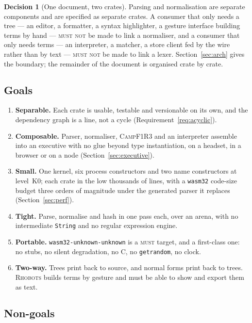 \documentclass[11pt,a4paper]{article}
\newcommand{\code}[1]{\texttt{#1}}
\newcommand{\Camp}{\textsc{CampF1R3}}
\newcommand{\Rhobots}{\textsc{Rhobots}}
\newcommand{\MUST}{\textsc{must}}
\newcommand{\MUSTNOT}{\textsc{must not}}
\theoremstyle{definition}
\newtheorem{decision}[definition]{Decision}
\theoremstyle{plain}
\begin{document}
\begin{decision}[One document, two crates]\label{dec:twocrates}
Parsing and normalisation are separate components and are specified as separate
crates. A consumer that only needs a tree --- an editor, a formatter, a syntax
highlighter, a gesture interface building terms by hand --- \MUSTNOT{} be made
to link a normaliser, and a consumer that only needs terms --- an interpreter, a
matcher, a store client fed by the wire rather than by text --- \MUSTNOT{} be
made to link a lexer. Section~\ref{sec:arch} gives the boundary; the remainder of
the document is organised crate by crate.
\end{decision}

\subsection{Goals}

\begin{enumerate}[nosep,leftmargin=1.6em]
\item \textbf{Separable.} Each crate is usable, testable and versionable on its
  own, and the dependency graph is a line, not a cycle
  (Requirement~\ref{req:acyclic}).
\item \textbf{Composable.} Parser, normaliser, \Camp{} and an interpreter
  assemble into an executive with no glue beyond type instantiation, on a
  headset, in a browser or on a node (Section~\ref{sec:executive}).
\item \textbf{Small.} One kernel, six process constructors and two name
  constructors at level~K0; each crate in the low thousands of lines, with a
  \code{wasm32} code-size budget three orders of magnitude under the generated
  parser it replaces (Section~\ref{sec:perf}).
\item \textbf{Tight.} Parse, normalise and hash in one pass each, over an arena,
  with no intermediate \code{String} and no regular expression engine.
\item \textbf{Portable.} \code{wasm32-unknown-unknown} is a \MUST{} target, and
  a first-class one: no stubs, no silent degradation, no C, no
  \code{getrandom}, no clock.
\item \textbf{Two-way.} Trees print back to source, and normal forms print back
  to trees. \Rhobots{} builds terms by gesture and must be able to show and
  export them as text.
\end{enumerate}

\subsection{Non-goals}
\end{document}
